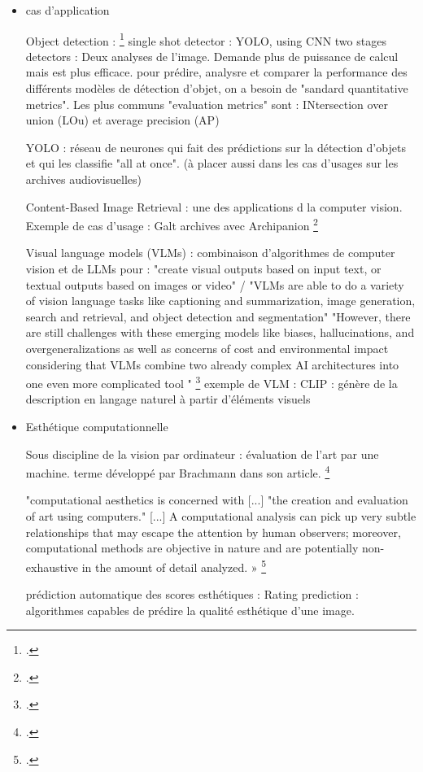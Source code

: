 \begin{itemize}
\item cas d'application

	\subitem Object detection : \footcite{2023b}
single shot detector : YOLO, using CNN
two stages detectors  : Deux analyses de l'image. Demande plus de puissance de calcul mais est plus efficace. 
pour prédire, analysre et comparer la performance des différents modèles de détection d'objet, on a besoin de "sandard quantitative metrics". 
Les plus communs "evaluation metrics" sont : INtersection over union (LOu) et average precision (AP) 

YOLO : réseau de neurones qui fait des prédictions sur la détection d'objets et qui les classifie "all at once". (à placer aussi dans les cas d'usages sur les archives audiovisuelles)

	\subitem Content-Based Image Retrieval : une des applications d la computer vision. Exemple de cas d'usage : Galt archives avec Archipanion \footcite{fewster}
	
	\subitem Visual language models (VLMs) : combinaison d'algorithmes de computer vision et de LLMs pour : "create visual outputs based on input text, or textual outputs based on images or video" / "VLMs are able to do a variety of vision language tasks like	captioning and summarization, image generation, search and retrieval, and	object detection and segmentation"
	"However, there are still	challenges with these emerging models like biases, hallucinations, and overgeneralizations as well as concerns of cost and environmental impact	considering that VLMs combine two already complex AI architectures into one	even more complicated tool "
	\footcite{fewster} 
	exemple de VLM : CLIP : génère de la description en langage naturel à partir d'éléments visuels
	
\item Esthétique computationnelle 

Sous discipline de la vision par ordinateur : évaluation de l'art par une machine. 
terme développé par Brachmann dans son article.
\footcite{brachmann2017}

"computational aesthetics is concerned with [...] "the creation and evaluation of art using computers." [...] A computational analysis can pick up very subtle relationships that may escape the attention by human observers; moreover, computational methods are objective in nature and are potentially non-exhaustive in the amount of detail analyzed. » \footcite{brachmann2017}

prédiction automatique des scores esthétiques : Rating prediction : algorithmes capables de prédire la qualité esthétique d'une image.


\end{itemize}
